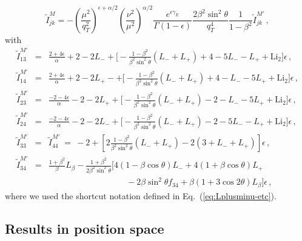 \documentclass[a4paper,11pt]{report}
\numberwithin{equation}{section}
\newcommand{\mixed}{{M}}
\newcommand{\Litwo}{{\text{Li}_2}}
\begin{document}
\begin{equation}
  \tilde I^{\mixed}_{jk} = 
  -\left(\frac{\mu^2}{q_T^2}\right)^{\epsilon+\alpha/2}
  \left(\frac{\nu^2}{\mu^2}\right)^{\alpha/2}
  \frac{e^{\epsilon\gamma_E}}{\Gamma(1-\epsilon)}
  \frac{2\beta^2\sin^2\theta}{q_T^4}
  \frac{1}{1-\beta^2}
  \tilde I^{\mixed'}_{jk}\,,
  \label{eq:mixed-soft-function-mom-fac}
\end{equation}
%
with
%
\begin{subequations}
\begin{eqnarray}
  \tilde I^{\mixed'}_{13}
  & = &
  \frac{2+4\epsilon}{\alpha}
  +2-2L_- +
  \bigg[
    -\frac{1-\beta^2}{\beta^2 \sin^2\theta} (L_-+L_+)
    + 4 - 5 L_- - L_+ + \Litwo
  \bigg] \epsilon\,,
  \\[0.5em]
  \tilde I^{\mixed'}_{14}
  & = &
  \frac{2+4\epsilon}{\alpha}
  +2-2L_+- +
  \bigg[
    -\frac{1-\beta^2}{\beta^2 \sin^2\theta} (L_-+L_+)
    + 4 - L_- - 5L_+ + \Litwo
  \bigg] \epsilon\,,
  \\[0.5em]
  \tilde I^{\mixed'}_{23}
  & = &
  \frac{-2-4\epsilon}{\alpha}
  -2-2L_+ +
  \bigg[
    -\frac{1-\beta^2}{\beta^2 \sin^2\theta} (L_-+L_+)
    - 2 - L_- - 5 L_+ + \Litwo
  \bigg] \epsilon\,,
  \\[0.5em]
  \tilde I^{\mixed'}_{24}
  & = &
  \frac{-2-4\epsilon}{\alpha}
  -2-2L_- +
  \bigg[
    -\frac{1-\beta^2}{\beta^2 \sin^2\theta} (L_-+L_+)
    - 2 - 5 L_- - L_+ + \Litwo
  \bigg] \epsilon\,,
  \\[0.5em]
  \tilde I^{\mixed'}_{33}
  & = &
  \tilde I^{\mixed'}_{44} \ = \
  -2 +
  \left[
    2\frac{1-\beta^2}{\beta^2 \sin^2\theta} (L_-+L_+) - 2(3+L_-+L_+)
  \right] \epsilon\,,
  \\[0.5em]
  \tilde I^{\mixed'}_{34}
  & = &
  \frac{1+\beta^2}{\beta} L_\beta
  - \frac{1+\beta^2}{2\beta^2\sin^2\theta} 
  \bigg[
  4(1-\beta\cos\theta) L_- + 4(1+\beta\cos\theta) L_+
  \nonumber \\
  & &
  \hspace{110pt}
  -2\beta\sin^2\theta f_{34} + \beta(1+3\cos 2\theta) L_\beta
  \bigg] \epsilon\,,
\end{eqnarray}
\end{subequations}
%
where we used the shortcut notation defined in Eq.~(\ref{eq:Lplusminu-etc}).

\subsection{Results in position space}
\end{document}
